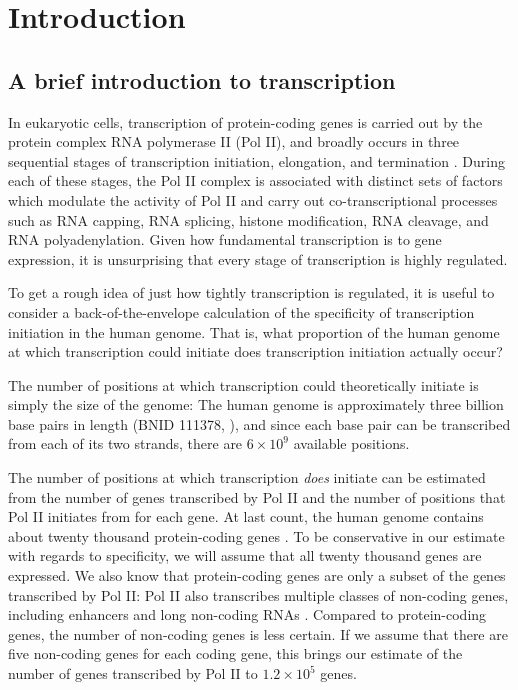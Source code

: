 \chapter{Introduction}

\section{A brief introduction to transcription}

In eukaryotic cells, transcription of protein-coding genes is carried out by the protein complex RNA polymerase II (Pol II), and broadly occurs in three sequential stages of transcription initiation, elongation, and termination \citep{shandilya2012}.
During each of these stages, the Pol II complex is associated with distinct sets of factors which modulate the activity of Pol II and carry out co-transcriptional processes such as RNA capping, RNA splicing, histone modification, RNA cleavage, and RNA polyadenylation.
Given how fundamental transcription is to gene expression, it is unsurprising that every stage of transcription is highly regulated.

To get a rough idea of just how tightly transcription is regulated, it is useful to consider a back-of-the-envelope calculation of the specificity of transcription initiation in the human genome.
That is, what proportion of the human genome at which transcription could initiate does transcription initiation actually occur?

The number of positions at which transcription could theoretically initiate is simply the size of the genome: The human genome is approximately three billion base pairs in length (BNID 111378, \citet{griffin2009}), and since each base pair can be transcribed from each of its two strands, there are $6 \times 10^9$ available positions.

The number of positions at which transcription \textit{does} initiate can be estimated from the number of genes transcribed by Pol II and the number of positions that Pol II initiates from for each gene.
At last count, the human genome contains about twenty thousand protein-coding genes \citep{encode2012}.
To be conservative in our estimate with regards to specificity, we will assume that all twenty thousand genes are expressed.
We also know that protein-coding genes are only a subset of the genes transcribed by Pol II: Pol II also transcribes multiple classes of non-coding genes, including enhancers and long non-coding RNAs \citep{kaikkonen2018}.
Compared to protein-coding genes, the number of non-coding genes is less certain.
If we assume that there are five non-coding genes for each coding gene, this brings our estimate of the number of genes transcribed by Pol II to $1.2 \times 10^5$ genes.

